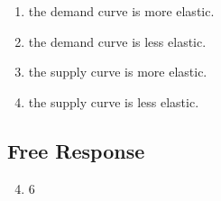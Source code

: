 \documentclass{article}
\begin{document}
\begin{enumerate}
	\begin{enumerate}
	
	\item the demand curve is more elastic.
	
	\item the demand curve is less elastic.
	
	\item the supply curve is more elastic.
	
	\item the supply curve is less elastic.
	
	\end{enumerate}

\end{enumerate}

\subsection*{Free Response}

\begin{enumerate}
\setcounter{enumi}{3}

\item 6

\end{enumerate}
\end{document}
